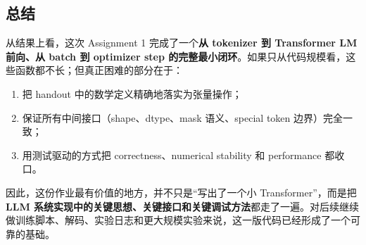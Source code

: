 \documentclass[UTF8,a4paper,11pt]{ctexart}
\begin{document}
\subsection{总结}
从结果上看，这次 Assignment 1 完成了一个\textbf{从 tokenizer 到 Transformer LM 前向、从 batch 到 optimizer step 的完整最小闭环}。如果只从代码规模看，这些函数都不长；但真正困难的部分在于：
\begin{enumerate}[leftmargin=2em]
  \item 把 handout 中的数学定义精确地落实为张量操作；
  \item 保证所有中间接口（shape、dtype、mask 语义、special token 边界）完全一致；
  \item 用测试驱动的方式把 correctness、numerical stability 和 performance 都收口。
\end{enumerate}

因此，这份作业最有价值的地方，并不只是“写出了一个小 Transformer”，而是把\textbf{LLM 系统实现中的关键思想、关键接口和关键调试方法}都走了一遍。对后续继续做训练脚本、解码、实验日志和更大规模实验来说，这一版代码已经形成了一个可靠的基础。
\end{document}

